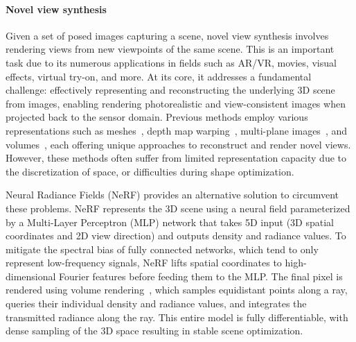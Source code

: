 \paragraph{Novel view synthesis}
Given a set of posed images capturing a scene, novel view synthesis involves rendering views from new viewpoints of the same scene. This is an important task due to its numerous applications in fields such as AR/VR, movies, visual effects, virtual try-on, and more. At its core, it addresses a fundamental challenge: effectively representing and reconstructing the underlying 3D scene from images, enabling rendering photorealistic and view-consistent images when projected back to the sensor domain. Previous methods employ various representations such as meshes~\cite{buehler2001unstructured,debevec2023modeling}, depth map warping~\cite{chen2023view,shade1998layered}, multi-plane images~\cite{flynn2019deepview,srinivasan2019pushing}, and volumes~\cite{henzler2018single,Lombardi2019,curless1996volumetric}, each offering unique approaches to reconstruct and render novel views. However, these methods often suffer from limited representation capacity due to the discretization of space, or difficulties during shape optimization.

Neural Radiance Fields (NeRF)\cite{mildenhall2020nerf} provides an alternative solution to circumvent these problems. NeRF represents the 3D scene using a neural field parameterized by a Multi-Layer Perceptron (MLP) network that takes 5D input (3D spatial coordinates and 2D view direction) and outputs density and radiance values. To mitigate the spectral bias\cite{tancik2020fourier} of fully connected networks, which tend to only represent low-frequency signals, NeRF lifts spatial coordinates to high-dimensional Fourier features before feeding them to the MLP. The final pixel is rendered using volume rendering~\cite{levoy1990efficient,max1995optical}, which samples equidistant points along a ray, queries their individual density and radiance values, and integrates the transmitted radiance along the ray. This entire model is fully differentiable, with dense sampling of the 3D space resulting in stable scene optimization. 

